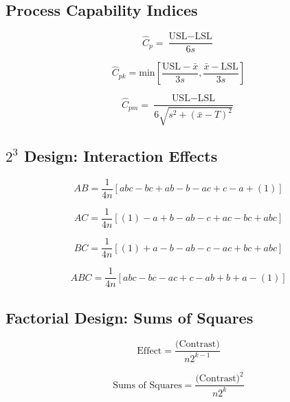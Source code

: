\documentclass[a4paper,12pt]{article}
\begin{document}
\newpage

\subsection*{Process Capability Indices}
\[ \hat{C}_p = \frac{\mbox{USL} - \mbox{LSL}}{6s}\]

\[ \hat{C}_{pk} = \mbox{min} \left[\frac{\mbox{USL} - \bar{x}}{3s},\frac{\bar{x} - \mbox{LSL}}{3s} \right] \]

\[ \hat{C}_{pm} = \frac{\mbox{USL} - \mbox{LSL}}{6\sqrt{s^2+(\bar{x}-T)^2}}\]
\bigskip
%
\subsection*{$2^3$ Design: Interaction Effects}

\[ AB = \frac{1}{4n} \left[ abc - bc + ab - b - ac + c - a + (1) \right] \]

\[ AC = \frac{1}{4n} \left[ (1) - a + b - ab -c + ac - bc + abc \right] \]

\[ BC = \frac{1}{4n} \left[ (1) + a - b - ab - c - ac + bc + abc \right] \]

\[ABC = \frac{1}{4n} \left[ abc - bc - ac + c - ab + b +  a - (1) \right] \]

\bigskip

\subsection*{Factorial Design: Sums of Squares}

\[\mbox{Effect} =  \frac{\mbox{(Contrast)}}{n2^{k-1}}\]

\[\mbox{Sums of Squares} =  \frac{\mbox{(Contrast)}^2}{n2^k}\]
\end{document}
